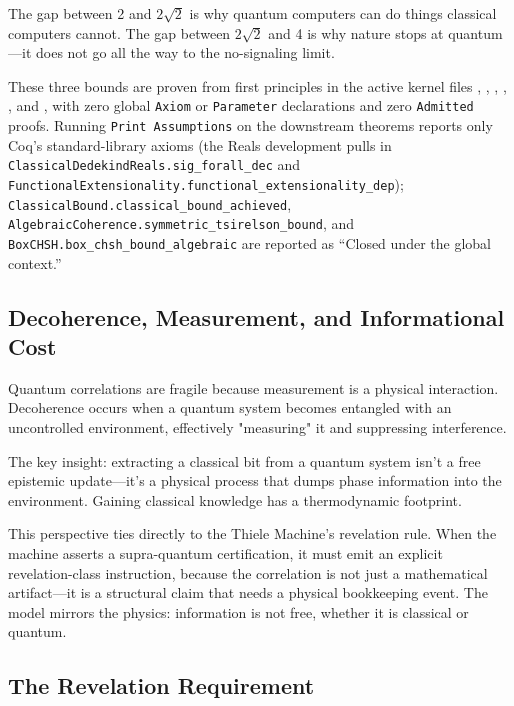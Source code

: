 The gap between 2 and $2\sqrt{2}$ is why quantum computers can do things classical computers cannot. The gap between $2\sqrt{2}$ and 4 is why nature stops at quantum---it does not go all the way to the no-signaling limit.

These three bounds are proven from first principles in the active kernel files , , , , , and , with zero global \texttt{Axiom} or \texttt{Parameter} declarations and zero \texttt{Admitted} proofs. Running \texttt{Print Assumptions} on the downstream theorems reports only Coq's standard-library axioms (the Reals development pulls in \texttt{ClassicalDedekindReals.sig\_forall\_dec} and \texttt{FunctionalExtensionality.functional\_extensionality\_dep}); \texttt{ClassicalBound.classical\_bound\_achieved}, \texttt{AlgebraicCoherence.symmetric\_tsirelson\_bound}, and \texttt{BoxCHSH.box\_chsh\_bound\_algebraic} are reported as ``Closed under the global context.''

\subsection{Decoherence, Measurement, and Informational Cost}

Quantum correlations are fragile because measurement is a physical interaction. Decoherence occurs when a quantum system becomes entangled with an uncontrolled environment, effectively "measuring" it and suppressing interference.

The key insight: extracting a classical bit from a quantum system isn't a free epistemic update---it's a physical process that dumps phase information into the environment. Gaining classical knowledge has a thermodynamic footprint.

This perspective ties directly to the Thiele Machine's revelation rule. When the machine asserts a supra-quantum certification, it must emit an explicit revelation-class instruction, because the correlation is not just a mathematical artifact---it is a structural claim that needs a physical bookkeeping event. The model mirrors the physics: information is not free, whether it is classical or quantum.

\subsection{The Revelation Requirement}

